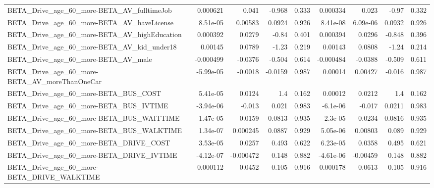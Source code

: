 \begin{tabular}{lrrrrrrrr}
BETA\_Drive\_age\_60\_more-BETA\_AV\_fulltimeJob         &    0.000621 &        0.041 &   -0.968 &    0.333 &   0.000334 &       0.023 &        -0.97 &         0.332 \\
BETA\_Drive\_age\_60\_more-BETA\_AV\_haveLicense         &    8.51e-05 &      0.00583 &   0.0924 &    0.926 &   8.41e-08 &    6.09e-06 &       0.0932 &         0.926 \\
BETA\_Drive\_age\_60\_more-BETA\_AV\_highEducation       &    0.000392 &       0.0279 &    -0.84 &    0.401 &   0.000394 &      0.0296 &       -0.848 &         0.396 \\
BETA\_Drive\_age\_60\_more-BETA\_AV\_kid\_under18         &     0.00145 &       0.0789 &    -1.23 &    0.219 &    0.00143 &      0.0808 &        -1.24 &         0.214 \\
BETA\_Drive\_age\_60\_more-BETA\_AV\_male                &   -0.000499 &      -0.0376 &   -0.504 &    0.614 &  -0.000484 &     -0.0388 &       -0.509 &         0.611 \\
BETA\_Drive\_age\_60\_more-BETA\_AV\_moreThanOneCar      &   -5.99e-05 &      -0.0018 &  -0.0159 &    0.987 &    0.00014 &     0.00427 &       -0.016 &         0.987 \\
BETA\_Drive\_age\_60\_more-BETA\_BUS\_COST               &    5.41e-05 &       0.0124 &      1.4 &    0.162 &    0.00012 &      0.0212 &          1.4 &         0.162 \\
BETA\_Drive\_age\_60\_more-BETA\_BUS\_IVTIME             &   -3.94e-06 &       -0.013 &    0.021 &    0.983 &   -6.1e-06 &      -0.017 &       0.0211 &         0.983 \\
BETA\_Drive\_age\_60\_more-BETA\_BUS\_WAITTIME           &    1.47e-05 &       0.0159 &   0.0813 &    0.935 &    2.3e-05 &      0.0234 &       0.0816 &         0.935 \\
BETA\_Drive\_age\_60\_more-BETA\_BUS\_WALKTIME           &    1.34e-07 &     0.000245 &   0.0887 &    0.929 &   5.05e-06 &     0.00803 &        0.089 &         0.929 \\
BETA\_Drive\_age\_60\_more-BETA\_DRIVE\_COST             &    3.53e-05 &       0.0257 &    0.493 &    0.622 &   6.23e-05 &      0.0358 &        0.495 &         0.621 \\
BETA\_Drive\_age\_60\_more-BETA\_DRIVE\_IVTIME           &   -4.12e-07 &    -0.000472 &    0.148 &    0.882 &  -4.61e-06 &    -0.00459 &        0.148 &         0.882 \\
BETA\_Drive\_age\_60\_more-BETA\_DRIVE\_WALKTIME         &    0.000112 &       0.0452 &    0.105 &    0.916 &   0.000178 &      0.0613 &        0.105 &         0.916 \\

\end{tabular}
